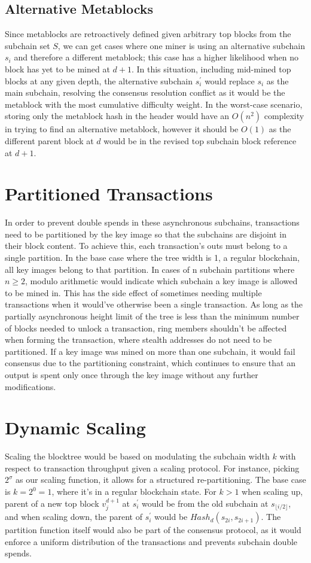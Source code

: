 \documentclass{article}
\begin{document}
\subsection{Alternative Metablocks}
Since metablocks are retroactively defined given arbitrary top blocks from the subchain set $S$, we can get cases where one miner is using an alternative subchain $s_i$ and therefore a different metablock; this case has a higher likelihood when no block has yet to be mined at $d+1$. In this situation, including mid-mined top blocks at any given depth, the alternative subchain $s_i^\prime$ would replace $s_i$ as the main subchain, resolving the consensus resolution conflict as it would be the metablock with the most cumulative difficulty weight. In the worst-case scenario, storing only the metablock hash in the header would have an $O(n^2)$ complexity in trying to find an alternative metablock, however it should be $O(1)$ as the different parent block at $d$ would be in the revised top subchain block reference at $d+1$.
\section{Partitioned Transactions}
In order to prevent double spends in these asynchronous subchains, transactions need to be partitioned by the key image so that the subchains are disjoint in their block content. To achieve this, each transaction's outs must belong to a single partition. In the base case where the tree width is 1, a regular blockchain, all key images belong to that partition. In cases of n subchain partitions where $n \geq 2$, modulo arithmetic would indicate which subchain a key image is allowed to be mined in. This has the side effect of sometimes needing multiple transactions when it would've otherwise been a single transaction. As long as the partially asynchronous height limit of the tree is less than the minimum number of blocks needed to unlock a transaction, ring members shouldn't be affected when forming the transaction, where stealth addresses do not need to be partitioned. If a key image was mined on more than one subchain, it would fail consensus due to the partitioning constraint, which continues to ensure that an output is spent only once through the key image without any further modifications.
\section{Dynamic Scaling}
Scaling the blocktree would be based on modulating the subchain width $k$ with respect to transaction throughput given a scaling protocol. For instance, picking $2^\sigma$ as our scaling function, it allows for a structured re-partitioning. The base case is $k = 2^0 = 1$, where it's in a regular blockchain state. For $k > 1$ when scaling up, parent of a new top block $v_j^{d+1}$ at $s_i^\prime$ would be from the old subchain at $s_{\lfloor i / 2\rfloor}$, and when scaling down, the parent of $s_i^\prime$ would be $Hash_d(s_{2i}, s_{2i + 1})$. The partition function itself would also be part of the consensus protocol, as it would enforce a uniform distribution of the transactions and prevents subchain double spends.
\end{document}
